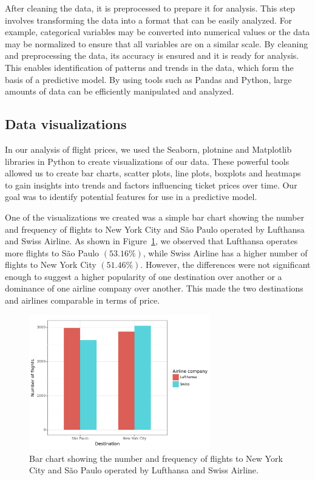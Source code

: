 After cleaning the data, it is preprocessed to prepare it for analysis. This step involves transforming the data into a format that can be easily analyzed.
For example, categorical variables may be converted into numerical values or the data may be normalized to ensure that all variables are on a similar scale.
By cleaning and preprocessing the data, its accuracy is ensured and it is ready for analysis.
This enables identification of patterns and trends in the data, which form the basis of a predictive model.
By using tools such as Pandas and Python, large amounts of data can be efficiently manipulated and analyzed.

\subsection{Data visualizations}
\label{sec:data}

In our analysis of flight prices, we used the Seaborn, plotnine and Matplotlib libraries in Python to create visualizations of our data.
These powerful tools allowed us to create bar charts, scatter plots, line plots, boxplots and heatmaps to gain insights into trends and factors influencing ticket prices over time.
Our goal was to identify potential features for use in a predictive model.

One of the visualizations we created was a simple bar chart showing the number and frequency of flights to New York City and São Paulo operated by Lufthansa and Swiss Airline.
As shown in Figure~\ref{fig:bar_pl}, we observed that Lufthansa operates more flights to São Paulo $(53.16\%)$, while Swiss Airline has a higher number of flights to New York City $(51.46\%)$.
However, the differences were not significant enough to suggest a higher popularity of one destination over another or a dominance of one airline company over another.
This made the two destinations and airlines comparable in terms of price.
\begin{figure}
    \centering
    \includegraphics[width=0.7\textwidth]{images/1_dest_num_flights.png}
    \caption{Bar chart showing the number and frequency of flights to New York City and São Paulo operated by Lufthansa and Swiss Airline.}
    \label{fig:bar_pl}
\end{figure}

